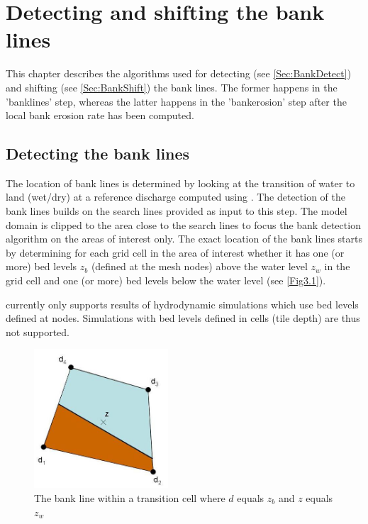\chapter{Detecting and shifting the bank lines} \label{Chp:BankDetect}

This chapter describes the algorithms used for detecting (see \autoref{Sec:BankDetect}) and shifting (see \autoref{Sec:BankShift}) the bank lines.
The former happens in the 'banklines' step, whereas the latter happens in the 'bankerosion' step after the local bank erosion rate has been computed.

\section{Detecting the bank lines} \label{Sec:BankDetect}

The location of bank lines is determined by looking at the transition of water to land (wet/dry) at a reference discharge computed using \dflowfm.
The detection of the bank lines builds on the search lines provided as input to this step.
The model domain is clipped to the area close to the search lines to focus the bank detection algorithm on the areas of interest only.
The exact location of the bank lines starts by determining for each grid cell in the area of interest whether it has one (or more) bed levels $z_b$ (defined at the mesh nodes) above the water level $z_w$ in the grid cell and one (or more) bed levels below the water level (see \autoref{Fig3.1}).

\Note \dfastbe currently only supports results of hydrodynamic simulations which use bed levels defined at nodes.
Simulations with bed levels defined in cells (tile depth) are thus not supported.

\begin{figure}[!h]
	\vspace{-0.25cm} 
	\center
	\includegraphics[width=5cm]{figures/Fig3-1.png}
	\caption{The bank line within a transition cell where $d$ equals $z_b$ and $z$ equals $z_w$}
	\label{Fig3.1}
	\vspace{-0.15cm} 
\end{figure}

